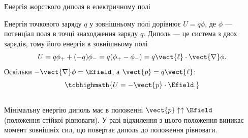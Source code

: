\documentclass{beamer}
\begin{document}
\begin{frame}{Енергія жорсткого диполя в електричному полі}{}
	\begin{block}{}\justifying
		Енергія точкового заряду $q$ у зовнішньому полі дорівнює $U = q\phi$, де $\phi$ ---
		потенціал поля в точці знаходження заряду $q$. Диполь --- це система з двох зарядів, тому
		його енергія в зовнішньому полі
		\begin{equation*}
			U= q\phi_+ + (-q)\phi_- = q (\phi_+ - \phi_-) = q \vect{\ell}\cdot\vect{\nabla}\phi.
		\end{equation*}
		Оскільки $-\vect{\nabla}\phi = \Efield$, а $\vect{p} = q\vect{\ell}$:
		\begin{equation*}
			\tcbhighmath{
				U = -\vect{p}\cdot\Efield.
			}
		\end{equation*}
	\end{block}
	\begin{columns}
		\begin{column}{0.75\linewidth}
			\begin{block}{}\justifying\small
				Мінімальну енергію диполь має в положенні $\vect{p}
					\uparrow\uparrow \Efield$ (положення стійкої рівноваги). У разі відхилення з
				цього
				положення
				виникає момент зовнішніх сил, що повертає диполь до положення рівноваги.
			\end{block}
		\end{column}
		\begin{column}{0.25\linewidth}\centering
			
		\end{column}
	\end{columns}
\end{frame}
\end{document}
